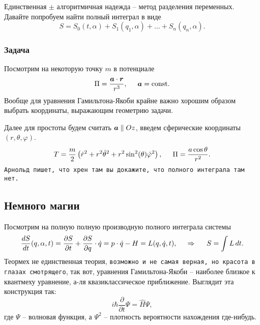 Единственная $\pm$ алгоритмичная надежда -- метод разделения переменных. Давайте попробуем найти полный интеграл в виде
\begin{equation*}
    S = S_0 (t, \alpha) + S_1 (q_1, \alpha) + \ldots + S_n (q_n, \alpha).
\end{equation*}

\subsubsection*{Задача}

Посмотрим на некоторую точку $m$ в потенциале 
\begin{equation*}
    \Pi = \frac{\mbox{\boldmath $a$} \cdot \mbox{\boldmath $r$}}{r^3}, \hspace{5 mm} \mbox{\boldmath $a$} = \text{const}.
\end{equation*}
Вообще для уравнения Гамильтона-Якоби крайне важно хорошим образом выбрать координаты, выражающим геометрию задачи.

Далее для простоты будем считать $\mbox{\boldmath $a$} \parallel Oz$, введем сферические координаты $(r, \theta, \varphi)$. 
\begin{equation*}
    T = \frac{m}{2} \left(
        \dot{r}^2 + r^2 \dot{\theta}^2 + r^2 \sin^2 (\theta) \dot{\varphi}^2
    \right),
    \hspace{5 mm}
    \Pi = \frac{a \cos \theta}{r^2}.
\end{equation*}
\texttt{Арнольд пишет, что хрен там вы докажите, что полного интеграла там нет.}

\subsection{Немного магии}

Посмотрим на полную полную производную полного интеграла системы
\begin{equation}
    \frac{d S}{d t}  (q, \alpha, t) = \frac{\partial S}{\partial t}  + \frac{\partial S}{\partial q}  \cdot \dot{q} = p \cdot \dot{q} - H = L (q, \dot{q}, t),
    \hspace{0.5cm} \Rightarrow \hspace{0.5cm}
    S = \int L \, d t.
\end{equation}
Теормех не единственная теория, \texttt{возможно и не самая верная, но красота в глазах смотрящего}, так вот, уравнения Гамильтона-Якоби -- наиболее близкое к квантмеху уравнение, а-ля квазиклассическое приближение. Выглядит эта конструкция так:
\begin{equation*}
    i \hbar \frac{\partial }{\partial t} \Psi = \hat{H} \Psi,
\end{equation*}
где $\Psi$ -- волновая функция, а $\Psi^2$ -- плотность вероятности нахождения где-нибудь. 

